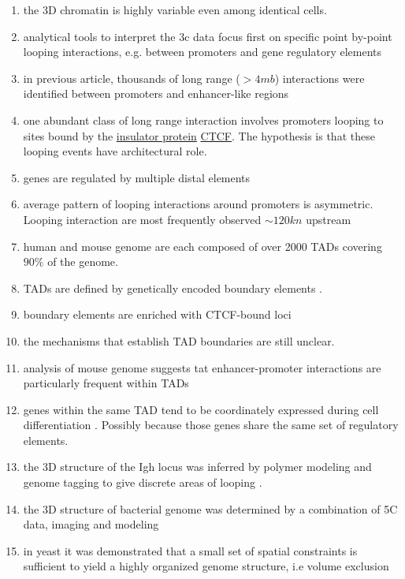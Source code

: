 \documentclass[12pt]{paper}
\begin{document}
\begin{enumerate}
\begin{enumerate}
\end{enumerate}
\item the 3D chromatin is highly variable even among identical cells\cite{marshall1997interphase}.
\item analytical tools to interpret the 3c data focus first on specific point by-point looping interactions, e.g. between promoters and gene regulatory elements
\item in previous article, thousands of long range ($>4mb$) interactions were identified between promoters and enhancer-like regions \cite{sanyal2012long}
\item one abundant class of long range interaction involves promoters looping to sites bound by the \href{http://en.wikipedia.org/wiki/Insulator_(genetics)}{insulator protein} \href{http://en.wikipedia.org/wiki/CTCF}{CTCF}. The hypothesis is that these looping events have architectural role. 
\item genes are regulated by multiple distal elements \cite{gerstein2012architecture}
\item average pattern of looping interactions around promoters is asymmetric. Looping interaction are most frequently observed $\sim120kn$ upstream
\item human and mouse genome are each composed of over 2000 TADs covering $90\%$ of the genome.
\item TADs are defined by genetically encoded boundary elements \cite{nora2012spatial}.
\item boundary elements are enriched with CTCF-bound loci
\item the mechanisms that establish TAD boundaries are still unclear. 
\item analysis of mouse genome suggests tat enhancer-promoter interactions are particularly frequent within TADs \cite{shen2012map}
\item genes within the same TAD tend to be coordinately expressed during cell differentiation \cite{nora2012spatial}. Possibly because those genes share the same set of regulatory elements. 
\item the 3D structure of the Igh locus was inferred by polymer modeling and genome tagging to give discrete areas of looping \cite{jhunjhunwala20083d}.
\item the 3D structure of bacterial genome was determined by a combination of 5C data, imaging and modeling \cite{umbarger2011three}
\item in yeast it was demonstrated that a small set of spatial constraints is sufficient to yield a highly organized genome structure, i.e volume exclusion \cite{tjong2012physical}

\end{enumerate}
\end{document}
